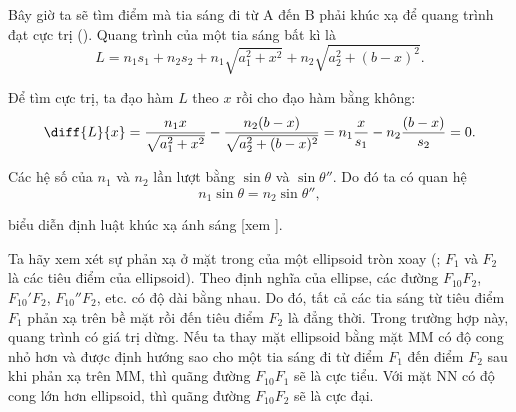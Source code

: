 Bây giờ ta sẽ tìm điểm mà tia sáng đi từ A đến B phải khúc xạ để quang trình đạt cực trị ().
Quang trình của một tia sáng bất kì là
\begin{equation*}
    L = n_1 s_1 + n_2 s_2 + n_1 \sqrt{a_1^2 + x^2} + n_2 \sqrt{a_2^2 + (b - x)^2}.
\end{equation*}

\noindent
Để tìm cực trị, ta đạo hàm $L$ theo $x$ rồi cho đạo hàm bằng không:
\begin{equation*}
    \diff{L}{x} = \frac{n_1 x}{\sqrt{a_1^2 + x^2}} - \frac{n_2 (b - x)}{\sqrt{a_2^2 + (b - x)^2}} = n_1 \frac{x}{s_1} - n_2 \frac{(b-x)}{s_2} = 0.
\end{equation*}

\noindent
Các hệ số của $n_1$ và $n_2$ lần lượt bằng $\sin\theta$ và $\sin\theta''$.
Do đó ta có quan hệ
\begin{equation*}
    n_1 \sin\theta = n_2 \sin\theta'',
\end{equation*}

\noindent
biểu diễn định luật khúc xạ ánh sáng [xem ].

Ta hãy xem xét sự phản xạ ở mặt trong của một ellipsoid tròn xoay (; $F_1$ và $F_2$ là các tiêu điểm của ellipsoid).
Theo định nghĩa của ellipse, các đường $F_10F_2$, $F_10'F_2$, $F_10''F_2$, etc. có độ dài bằng nhau.
Do đó, tất cả các tia sáng từ tiêu điểm $F_1$ phản xạ trên bề mặt rồi đến tiêu điểm $F_2$ là đẳng thời.
Trong trường hợp này, quang trình có giá trị dừng.
Nếu ta thay mặt ellipsoid bằng mặt MM có độ cong nhỏ hơn và được định hướng sao cho một tia sáng đi từ điểm $F_1$ đến điểm $F_2$ sau khi phản xạ trên MM, thì quãng đường $F_10F_1$ sẽ là cực tiểu.
Với mặt NN có độ cong lớn hơn ellipsoid, thì quãng đường $F_10F_2$ sẽ là cực đại.

